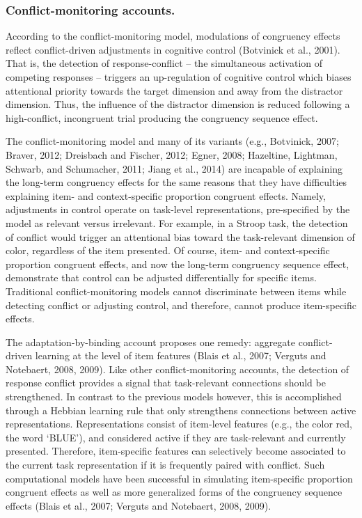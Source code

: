\documentclass[]{DissertateCUNY}
\begin{document}
\hypertarget{conflict-monitoring-accounts.}{%
\subsubsection{Conflict-monitoring
accounts.}\label{conflict-monitoring-accounts.}}

According to the conflict-monitoring model, modulations of congruency
effects reflect conflict-driven adjustments in cognitive control
(Botvinick et al., 2001). That is, the detection of response-conflict --
the simultaneous activation of competing responses -- triggers an
up-regulation of cognitive control which biases attentional priority
towards the target dimension and away from the distractor dimension.
Thus, the influence of the distractor dimension is reduced following a
high-conflict, incongruent trial producing the congruency sequence
effect.

The conflict-monitoring model and many of its variants (e.g., Botvinick,
2007; Braver, 2012; Dreisbach and Fischer, 2012; Egner, 2008; Hazeltine,
Lightman, Schwarb, and Schumacher, 2011; Jiang et al., 2014) are
incapable of explaining the long-term congruency effects for the same
reasons that they have difficulties explaining item- and
context-specific proportion congruent effects. Namely, adjustments in
control operate on task-level representations, pre-specified by the
model as relevant versus irrelevant. For example, in a Stroop task, the
detection of conflict would trigger an attentional bias toward the
task-relevant dimension of color, regardless of the item presented. Of
course, item- and context-specific proportion congruent effects, and now
the long-term congruency sequence effect, demonstrate that control can
be adjusted differentially for specific items. Traditional
conflict-monitoring models cannot discriminate between items while
detecting conflict or adjusting control, and therefore, cannot produce
item-specific effects.

The adaptation-by-binding account proposes one remedy: aggregate
conflict-driven learning at the level of item features (Blais et al.,
2007; Verguts and Notebaert, 2008, 2009). Like other conflict-monitoring
accounts, the detection of response conflict provides a signal that
task-relevant connections should be strengthened. In contrast to the
previous models however, this is accomplished through a Hebbian learning
rule that only strengthens connections between active representations.
Representations consist of item-level features (e.g., the color red, the
word `BLUE'), and considered active if they are task-relevant and
currently presented. Therefore, item-specific features can selectively
become associated to the current task representation if it is frequently
paired with conflict. Such computational models have been successful in
simulating item-specific proportion congruent effects as well as more
generalized forms of the congruency sequence effects (Blais et al.,
2007; Verguts and Notebaert, 2008, 2009).
\end{document}
